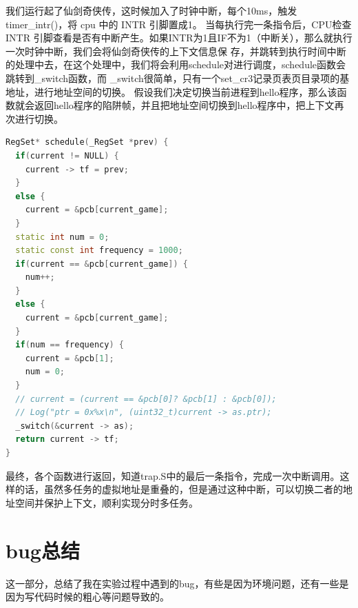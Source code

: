 \documentclass[UTF8,a4paper,10pt]{ctexart}
\begin{document}
我们运行起了仙剑奇侠传，这时候加入了时钟中断，每个10ms，触发timer\_intr()，将 cpu 中的 INTR 引脚置成1。 当每执行完一条指令后，CPU检查 INTR 引脚查看是否有中断产生。如果INTR为1且IF不为1（中断关），那么就执行一次时钟中断，我们会将仙剑奇侠传的上下文信息保 存，并跳转到执行时间中断的处理中去，在这个处理中，我们将会利用schedule对进行调度，schedule函数会跳转到\_switch函数，而 \_switch很简单，只有一个set\_cr3记录页表页目录项的基地址，进行地址空间的切换。
假设我们决定切换当前进程到hello程序，那么该函数就会返回hello程序的陷阱帧，并且把地址空间切换到hello程序中，把上下文再次进行切换。
\begin{lstlisting}[language = C++]
RegSet* schedule(_RegSet *prev) {
  if(current != NULL) {
    current -> tf = prev;
  }
  else {
    current = &pcb[current_game];
  }
  static int num = 0;
  static const int frequency = 1000;
  if(current == &pcb[current_game]) {
    num++;
  }
  else {
    current = &pcb[current_game];
  }
  if(num == frequency) {
    current = &pcb[1];
    num = 0;
  }
  // current = (current == &pcb[0]? &pcb[1] : &pcb[0]);
  // Log("ptr = 0x%x\n", (uint32_t)current -> as.ptr);
  _switch(&current -> as);
  return current -> tf;
}

\end{lstlisting}


最终，各个函数进行返回，知道trap.S中的最后一条指令，完成一次中断调用。这样的话，虽然多任务的虚拟地址是重叠的，但是通过这种中断，可以切换二者的地址空间并保护上下文，顺利实现分时多任务。









\section{bug总结}
这一部分，总结了我在实验过程中遇到的bug，有些是因为环境问题，还有一些是因为写代码时候的粗心等问题导致的。
\end{document}

